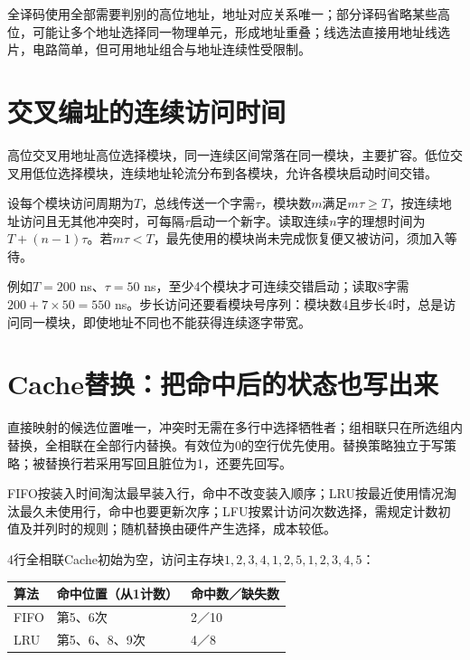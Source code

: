全译码使用全部需要判别的高位地址，地址对应关系唯一；部分译码省略某些高位，可能让多个地址选择同一物理单元，形成地址重叠；线选法直接用地址线选片，电路简单，但可用地址组合与地址连续性受限制。

\section{交叉编址的连续访问时间}\label{CO03-interleave-complete}

高位交叉用地址高位选择模块，同一连续区间常落在同一模块，主要扩容。低位交叉用低位选择模块，连续地址轮流分布到各模块，允许各模块启动时间交错。

设每个模块访问周期为\(T\)，总线传送一个字需\(\tau\)，模块数\(m\)满足\(m\tau\ge T\)，按连续地址访问且无其他冲突时，可每隔\(\tau\)启动一个新字。读取连续\(n\)字的理想时间为\(T+(n-1)\tau\)。若\(m\tau<T\)，最先使用的模块尚未完成恢复便又被访问，须加入等待。

例如\(T=200\) ns、\(\tau=50\) ns，至少4个模块才可连续交错启动；读取8字需\(200+7\times50=550\) ns。步长访问还要看模块号序列：模块数4且步长4时，总是访问同一模块，即使地址不同也不能获得连续逐字带宽。

\section{Cache替换：把命中后的状态也写出来}\label{CO03-replacement-complete}

直接映射的候选位置唯一，冲突时无需在多行中选择牺牲者；组相联只在所选组内替换，全相联在全部行内替换。有效位为0的空行优先使用。替换策略独立于写策略；被替换行若采用写回且脏位为1，还要先回写。

FIFO按装入时间淘汰最早装入行，命中不改变装入顺序；LRU按最近使用情况淘汰最久未使用行，命中也要更新次序；LFU按累计访问次数选择，需规定计数初值及并列时的规则；随机替换由硬件产生选择，成本较低。

4行全相联Cache初始为空，访问主存块\(1,2,3,4,1,2,5,1,2,3,4,5\)：

\par\medskip\noindent\begin{minipage}{\linewidth}\fontsize{9.3}{12}\selectfont\begin{tabularx}{\linewidth}{@{}YYY@{}}
\toprule\noalign{}
算法 & 命中位置（从1计数） & 命中数／缺失数 \\
\midrule\noalign{}


FIFO & 第5、6次 & 2／10 \\
LRU & 第5、6、8、9次 & 4／8 \\
\bottomrule\end{tabularx}
\end{minipage}\par\medskip

